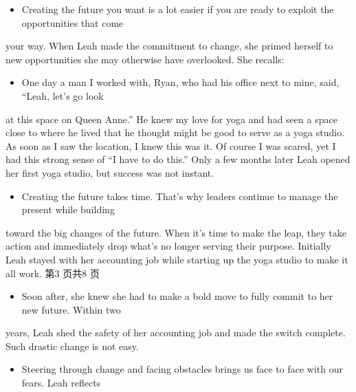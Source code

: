 \documentclass[UTF8,11pt]{ctexart}
\begin{document}
\begin{itemize}[leftmargin=2em,itemsep=.2em,topsep=.4em]\item[G.] Creating the future you want is a lot easier if you are ready to exploit the opportunities that come
\end{itemize}

your way. When Leah made the commitment to change, she primed herself to new opportunities she may otherwise have overlooked. She recalls:


\begin{itemize}[leftmargin=2em,itemsep=.2em,topsep=.4em]\item[H.] One day a man I worked with, Ryan, who had his office next to mine, said, “Leah, let’s go look
\end{itemize}

at this space on Queen Anne.” He knew my love for yoga and had seen a space close to where he lived that he thought might be good to serve as a yoga studio. As soon as I saw the location, I knew this was it. Of course I was scared, yet I had this strong sense of “I have to do this.” Only a few months later Leah opened her first yoga studio, but success was not instant.


\begin{itemize}[leftmargin=2em,itemsep=.2em,topsep=.4em]\item[I.] Creating the future takes time. That’s why leaders continue to manage the present while building
\end{itemize}

toward the big changes of the future. When it’s time to make the leap, they take action and immediately drop what’s no longer serving their purpose. Initially Leah stayed with her accounting job while starting up the yoga studio to make it all work. 第3 页共8 页


\begin{itemize}[leftmargin=2em,itemsep=.2em,topsep=.4em]\item[J.] Soon after, she knew she had to make a bold move to fully commit to her new future. Within two
\end{itemize}

years, Leah shed the safety of her accounting job and made the switch complete. Such drastic change is not easy.


\begin{itemize}[leftmargin=2em,itemsep=.2em,topsep=.4em]\item[K.] Steering through change and facing obstacles brings us face to face with our fears. Leah reflects
\end{itemize}
\end{document}
